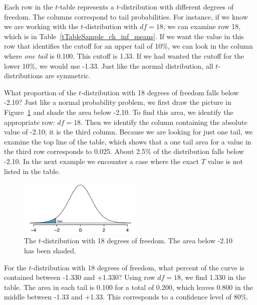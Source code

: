 Each row in the $t$-table represents a $t$-distribution with different degrees of freedom. The columns correspond to tail probabilities. For instance, if we know we are working with the $t$-distribution with $df=18$, we can examine row 18, which is  in Table~\ref{tTableSample_ch_inf_means}. If we want the value in this row that identifies the cutoff for an upper tail of 10\%, we can look in the column where \emph{one tail} is 0.100. This cutoff is 1.33. If we had wanted the cutoff for the lower 10\%, we would use -1.33. Just like the normal distribution, all $t$-distributions are symmetric.


\begin{example}{What proportion of the $t$-distribution with 18 degrees of freedom falls below -2.10?}
Just like a normal probability problem, we first draw the picture in Figure~\ref{tDistDF18LeftTail2Point10} and shade the area below -2.10. To find this area, we identify the appropriate row: $df=18$. Then we identify the column containing the absolute value of -2.10; it is the third column. Because we are looking for just one tail, we examine the top line of the table, which shows that a one tail area for a value in the third row corresponds to 0.025. About 2.5\% of the distribution falls below -2.10. In the next example we encounter a case where the exact $T$ value is not listed in the table.
\end{example}

\begin{figure}
\centering
\includegraphics[width=0.53\textwidth]{ch_inference_for_means/figures/tDistDF18LeftTail2Point10/tDistDF18LeftTail2Point10}
\caption{The $t$-distribution with 18 degrees of freedom. The area below -2.10 has been shaded.}
\label{tDistDF18LeftTail2Point10}
\end{figure}

\textA{\newpage}

\begin{example}{For the $t$-distribution with 18 degrees of freedom, what percent of the curve is contained between -1.330 and +1.330?}
Using row $df = 18$, we find 1.330 in the table. The area in each tail is 0.100 for a total of 0.200, which leaves 0.800 in the middle between -1.33 and +1.33. This corresponds to a confidence level of 80\%.
\end{example}

